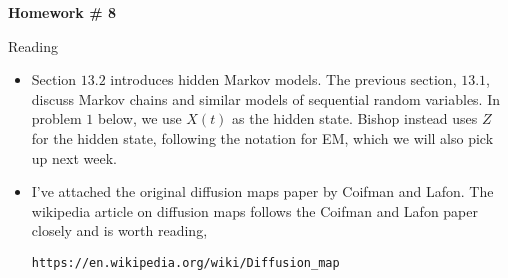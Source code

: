 \documentclass{article}
\begin{document}
\renewcommand{\a}{\textbf{a}}
\renewcommand{\b}{\textbf{b}}
\renewcommand{\d}{\textbf{d}}
\newcommand{\e}{\textbf{e}}

\large

\begin{center}
\textbf{Homework \# 8} \\  
\end{center}



\medskip


\newcommand{\normal}{\mathcal{N}}

Reading
\begin{itemize}
\item Section $13.2$ introduces hidden Markov models.  The previous section, $13.1$, discuss Markov chains and similar models of sequential random variables.  In problem $1$ below, we use $X(t)$ as the hidden state.  Bishop instead uses $Z$ for the hidden state, following the notation for EM, which we will also pick up next week.
\item I've attached the original diffusion maps paper by Coifman and Lafon.  The wikipedia article on diffusion maps follows the Coifman and Lafon paper closely and is worth reading,
\begin{verbatim}
https://en.wikipedia.org/wiki/Diffusion_map
\end{verbatim}
\end{itemize}

\vspace{.5cm}
\end{document}
